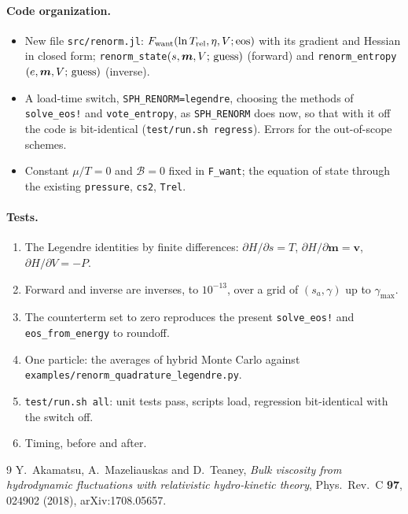 \documentclass[11pt,aps,preprint,nofootinbib,superscriptaddress,tightenlines]{revtex4-2}
\let\oldparagraph\paragraph
\renewcommand{\paragraph}{\par\bigskip\oldparagraph}
\begin{document}
\paragraph{Code organization.}
\begin{itemize}
\item New file \nolinkurl{src/renorm.jl}: $F_{\rm want}(\ln T_{\rm rel},\eta,V;{\rm eos})$ with its gradient and Hessian in closed form; \texttt{renorm\_state}$(s,\bm m,V;\,{\rm guess})$
  (forward) and \texttt{renorm\_entropy}$(e,\bm m,V;\,{\rm guess})$ (inverse).
\item A load-time switch, \texttt{SPH\_RENORM=legendre}, choosing the methods of \texttt{solve\_eos!} and \texttt{vote\_entropy}, as \texttt{SPH\_RENORM} does now, so that with
  it off the code is bit-identical (\texttt{test/run.sh regress}).  Errors for the out-of-scope schemes.
\item Constant $\mu/T=0$ and $\mathcal B=0$ fixed in \texttt{F\_want}; the equation of state through the existing \texttt{pressure}, \texttt{cs2}, \texttt{Trel}.
\end{itemize}

\paragraph{Tests.}
\begin{enumerate}
\item The Legendre identities by finite differences: $\partial H/\partial s=T$, $\partial H/\partial\bm m=\bm v$, $\partial H/\partial V=-P$.
\item Forward and inverse are inverses, to $10^{-13}$, over a grid of $(s_a,\gamma)$ up to $\gamma_{\max}$.
\item The counterterm set to zero reproduces the present \texttt{solve\_eos!} and \texttt{eos\_from\_energy} to roundoff.
\item One particle: the averages of hybrid Monte Carlo against \nolinkurl{examples/renorm_quadrature_legendre.py}.
\item \texttt{test/run.sh all}: unit tests pass, scripts load, regression bit-identical with the switch off.
\item Timing, before and after.
\end{enumerate}
\endgroup

\begin{thebibliography}{9}
 Y.~Akamatsu, A.~Mazeliauskas and D.~Teaney, \emph{Bulk viscosity from hydrodynamic fluctuations with relativistic hydro-kinetic theory},
  Phys.\ Rev.\ C \textbf{97}, 024902 (2018), arXiv:1708.05657.
\end{thebibliography}
\end{document}
